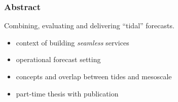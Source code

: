 \begin{frame}
\frametitle{Abstract}

Combining, evaluating and delivering ``tidal'' forecasts.
\vspace{0.5cm}
\begin{itemize}
    \item context of building \emph{seamless} services 
    \item operational forecast setting
    \item concepts and overlap between tides and mesoscale
    \item part-time thesis with publication
\end{itemize}

\end{frame}